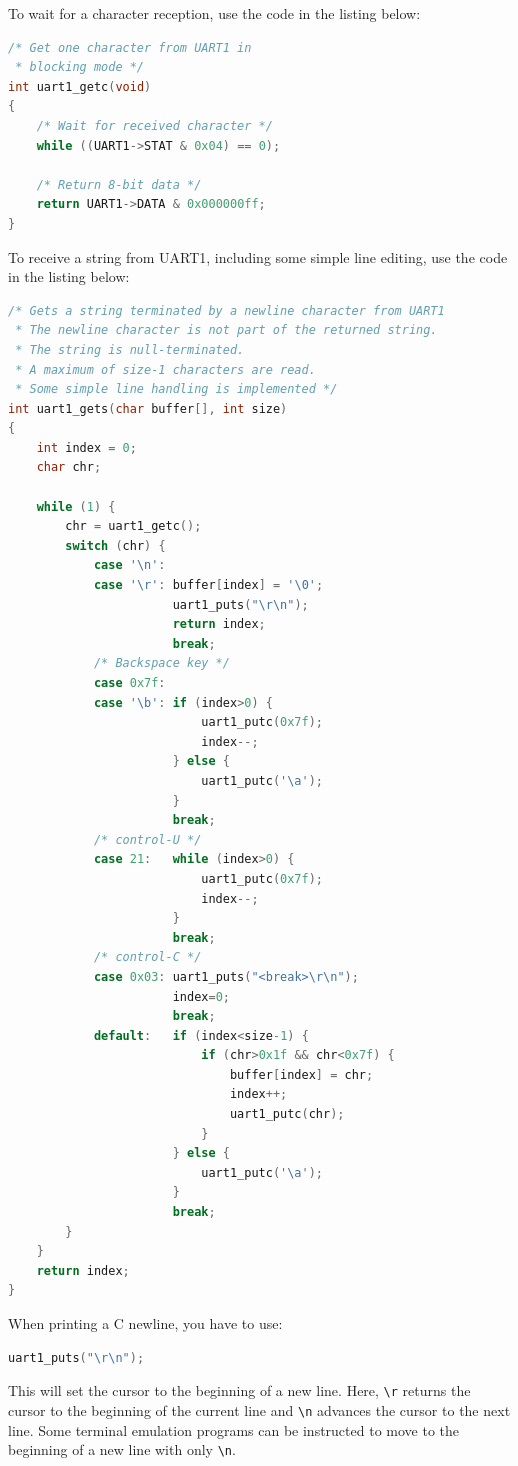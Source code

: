 \documentclass[12pt]{article}
\begin{document}
To wait for a character reception, use the code in the listing below:

\begin{lstlisting}[language=C]
/* Get one character from UART1 in
 * blocking mode */
int uart1_getc(void)
{
    /* Wait for received character */
    while ((UART1->STAT & 0x04) == 0);

    /* Return 8-bit data */
    return UART1->DATA & 0x000000ff;
}
\end{lstlisting}

To receive a string from UART1, including some simple line editing, use the code in the listing below:

\begin{lstlisting}[language=C]
/* Gets a string terminated by a newline character from UART1
 * The newline character is not part of the returned string.
 * The string is null-terminated.
 * A maximum of size-1 characters are read.
 * Some simple line handling is implemented */
int uart1_gets(char buffer[], int size)
{
	int index = 0;
	char chr;

	while (1) {
		chr = uart1_getc();
		switch (chr) {
			case '\n':
			case '\r': buffer[index] = '\0';
					   uart1_puts("\r\n");
					   return index;
					   break;
			/* Backspace key */
			case 0x7f:
			case '\b': if (index>0) {
						   uart1_putc(0x7f);
						   index--;
					   } else {
					       uart1_putc('\a');
				       }
					   break;
			/* control-U */
			case 21:   while (index>0) {
					       uart1_putc(0x7f);
						   index--;
					   }
					   break;
			/* control-C */
			case 0x03: uart1_puts("<break>\r\n");
					   index=0;
					   break;
			default:   if (index<size-1) {
					       if (chr>0x1f && chr<0x7f) {
						       buffer[index] = chr;
							   index++;
							   uart1_putc(chr);
						   }
					   } else {
						   uart1_putc('\a');
					   }
					   break;
		}
	}
	return index;
}
\end{lstlisting}

When printing a C newline, you have to use:

\begin{lstlisting}[language=C]
uart1_puts("\r\n");
\end{lstlisting}

This will set the cursor to the beginning of a new line. Here, \lstinline|\r| returns the cursor to the beginning of the current line and \lstinline|\n| advances the cursor to the next line. Some terminal emulation programs can be instructed to move to the beginning of a new line with only \lstinline|\n|.
\end{document}
